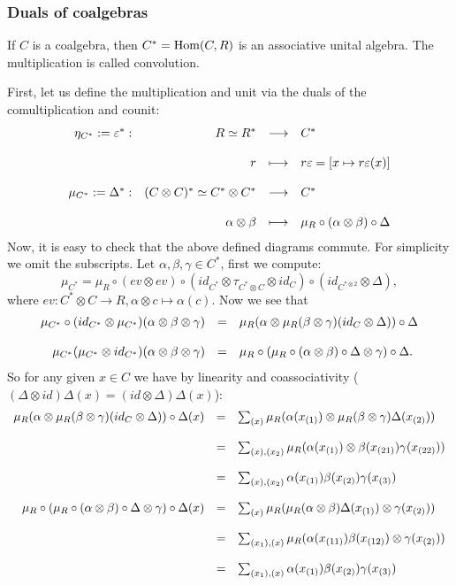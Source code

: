 \subsubsection{Duals of coalgebras}
\begin{prop}\label{prop06}
If $C$ is a coalgebra, then $C^* = \trm{Hom}(C,R)$ is an associative unital algebra. The multiplication is called convolution.
\end{prop}
\bws First, let us define the multiplication and unit via the duals of the comultiplication and counit:
$$\bao{rrcl}
\eta_{C^*} := \eps^* :& R \simeq R^* &\longrightarrow& C^*\\
&&&\\
&r &\longmapsto& r \eps = [x \mapsto r \eps(x)]\\
&&&\\
\mu_{C^*} := \Delta^* :& (C \otimes C)^* \simeq C^* \otimes C^* &\longrightarrow & C^*\\
&&&\\
&\alpha \otimes \beta &\longmapsto& \mu_R \circ (\alpha \otimes \beta) \circ \Delta\\
\ea$$
Now, it is easy to check that the above defined diagrams commute. For simplicity we omit the subscripts. Let $\alpha, \beta, \gamma \in C^*$, first we compute:
$$\mu_{C^*} = \mu_R \circ (ev \otimes ev) \circ (id_{C^*} \otimes \tau_{C^*\otimes C} \otimes id_C) \circ (id_{C^{* \otimes 2}} \otimes \Delta),$$
where $ev : C^* \otimes C \longrightarrow R, \alpha \otimes c \longmapsto \alpha(c)$. Now we see that
$$\bao{rcl}
\mu_{C^*} \circ (id_{C^*} \otimes \mu_{C^*})(\alpha \otimes \beta \otimes \gamma) &=& \mu_R(\alpha \otimes \mu_R(\beta \otimes \gamma)(id_C \otimes \Delta)) \circ \Delta\\
&&\\
\mu_{C^*}(\mu_{C^*} \otimes id_{C^*})(\alpha\otimes\beta\otimes\gamma) &=& \mu_R \circ (\mu_R \circ (\alpha \otimes \beta) \circ \Delta \otimes \gamma)\circ \Delta.\\
\ea$$
So for any given $x \in C$ we have by linearity and coassociativity ($(\Delta \otimes id)\Delta(x) = (id \otimes \Delta)\Delta(x)$):
$$\bao{rcl}
\mu_R(\alpha \otimes \mu_R(\beta \otimes \gamma)(id_C \otimes \Delta)) \circ \Delta(x) &=& \sum_{(x)} \mu_R(\alpha(x_{(1)}) \otimes \mu_R(\beta \otimes \gamma)\Delta(x_{(2)}))\\
&&\\
 &=& \sum_{(x),(x_2)} \mu_R(\alpha(x_{(1)}) \otimes \beta(x_{(21)}) \gamma(x_{(22)}))\\
&&\\
 &=& \sum_{(x),(x_2)} \alpha(x_{(1)}) \beta(x_{(2)}) \gamma(x_{(3)})\\
&&\\
\mu_R \circ (\mu_R \circ (\alpha \otimes \beta) \circ \Delta \otimes \gamma)\circ \Delta(x) &=& \sum_{(x)} \mu_R(\mu_R(\alpha \otimes \beta)\Delta(x_{(1)}) \otimes \gamma(x_{(2)}))\\
&&\\
 &=& \sum_{(x_1),(x)} \mu_R(\alpha(x_{(11)}) \beta(x_{(12)}) \otimes \gamma(x_{(2)}))\\
 &&\\
 &=& \sum_{(x_1),(x)} \alpha(x_{(1)}) \beta(x_{(2)}) \gamma(x_{(3)})\\
\ea$$
